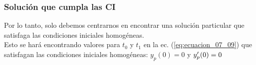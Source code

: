 \documentclass[12pt]{beamer}
\begin{document}
\begin{frame}
\frametitle{Solución que cumpla las CI}
Por lo tanto, solo debemos centrarnos en encontrar una solución particular que satisfaga las condiciones iniciales homogéneas.
\\
\bigskip
\pause
Esto se hará encontrando valores para $t_{0}$ y $t_{1}$ en la ec. (\ref{eq:ecuacion_07_09}) que satisfagan las condiciones iniciales homogéneas: $y_{p} (0) = 0$ y ${y}^{\prime}_{p} (0) = 0$
\end{frame}
\end{document}
